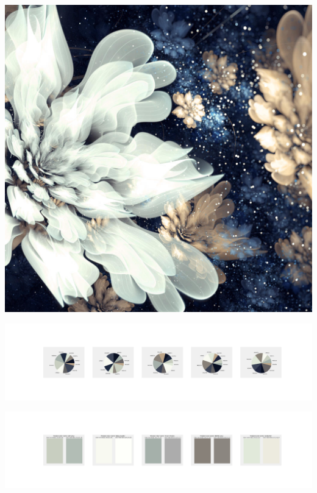 \documentclass[11pt]{article}
\begin{document}
\begin{landscape}
    \begin{center}
    \includegraphics[width=\textwidth]{./nbimg/file (379).jpg}
    \end{center}

    \begin{center}
    \includegraphics[width=250mm]{./nbimg/pie-310.jpg}
    \end{center}

    \begin{center}
    \includegraphics[width=250mm]{./nbimg/peak-310.jpg}
    \end{center}
    


\end{landscape}
\end{document}
